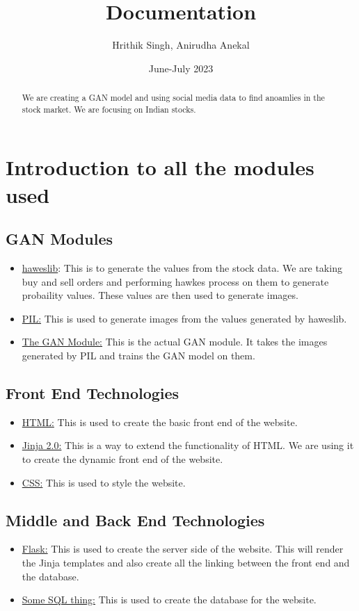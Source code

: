 \documentclass{article}
\begin{document}
\title{Documentation}
\author{Hrithik Singh, Anirudha Anekal}
\date{June-July 2023}
\maketitle
\begin{abstract}
We are creating a GAN model and using social media data to find anoamlies in the stock market. We are focusing on Indian stocks.
\end{abstract}
\section{Introduction to all the modules used}
\subsection{GAN Modules}
\begin{itemize}
\item \underline{haweslib}: This is to generate the values from the stock data. We are taking buy and sell orders and performing hawkes process on them to generate probaility values. These values are then used to generate images.
\item \underline{PIL:} This is used to generate images from the values generated by haweslib.
\item \underline{The GAN Module:} This is the actual GAN module. It takes the images generated by PIL and trains the GAN model on them.
\end{itemize}
\subsection{Front End Technologies}
\begin{itemize}
\item \underline{HTML:} This is used to create the basic front end of the website.
\item \underline{Jinja 2.0:} This is a way to extend the functionality of HTML. We are using it to create the dynamic front end of the website.
\item \underline{CSS:} This is used to style the website.
\end{itemize}
\subsection{Middle and Back End Technologies}
\begin{itemize}
\item \underline{Flask:} This is used to create the server side of the website. This will render the Jinja templates and also create all the linking between the front end and the database.
\item \underline{Some SQL thing:} This is used to create the database for the website.
\end{itemize}
\end{document}
